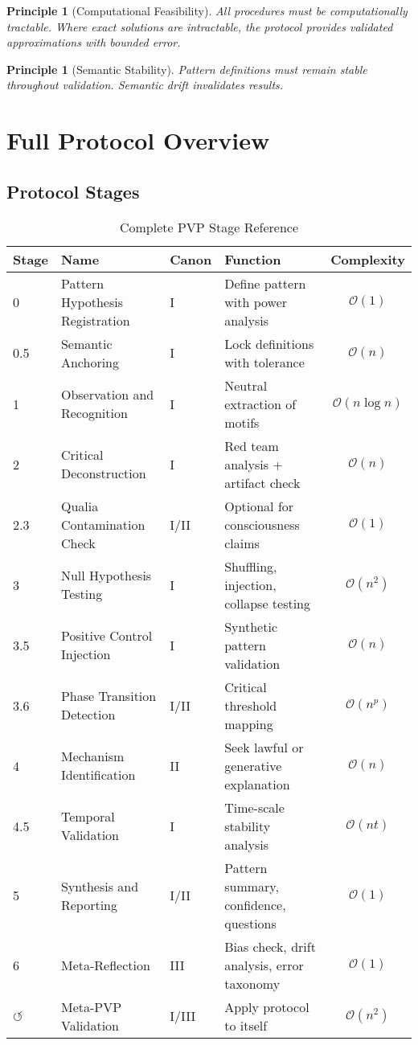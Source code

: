 \documentclass[12pt,oneside]{memoir}
\theoremstyle{plain}
\newtheorem{principle}[theorem]{Principle}
\theoremstyle{definition}
\theoremstyle{remark}
\newcommand{\PVP}{\textsc{PVP}}
\newcommand{\BigO}{\mathcal{O}}
\begin{document}
\begin{principle}[Computational Feasibility]
All procedures must be computationally tractable. Where exact solutions are intractable, the protocol provides validated approximations with bounded error.
\end{principle}

\begin{principle}[Semantic Stability]
Pattern definitions must remain stable throughout validation. Semantic drift invalidates results.
\end{principle}

\chapter{Full Protocol Overview}

\section{Protocol Stages}

\begin{table}[h]
\centering
\caption{Complete \PVP{} Stage Reference}
\label{tab:stages}
\begin{tabular}{llllc}
\toprule
\textbf{Stage} & \textbf{Name} & \textbf{Canon} & \textbf{Function} & \textbf{Complexity} \\
\midrule
0 & Pattern Hypothesis Registration & I & Define pattern with power analysis & $\BigO(1)$ \\
0.5 & Semantic Anchoring & I & Lock definitions with tolerance & $\BigO(n)$ \\
1 & Observation and Recognition & I & Neutral extraction of motifs & $\BigO(n \log n)$ \\
2 & Critical Deconstruction & I & Red team analysis + artifact check & $\BigO(n)$ \\
2.3 & Qualia Contamination Check & I/II & Optional for consciousness claims & $\BigO(1)$ \\
3 & Null Hypothesis Testing & I & Shuffling, injection, collapse testing & $\BigO(n^2)$ \\
3.5 & Positive Control Injection & I & Synthetic pattern validation & $\BigO(n)$ \\
3.6 & Phase Transition Detection & I/II & Critical threshold mapping & $\BigO(n^p)$ \\
4 & Mechanism Identification & II & Seek lawful or generative explanation & $\BigO(n)$ \\
4.5 & Temporal Validation & I & Time-scale stability analysis & $\BigO(nt)$ \\
5 & Synthesis and Reporting & I/II & Pattern summary, confidence, questions & $\BigO(1)$ \\
6 & Meta-Reflection & III & Bias check, drift analysis, error taxonomy & $\BigO(1)$ \\
$\circlearrowleft$ & Meta-PVP Validation & I/III & Apply protocol to itself & $\BigO(n^2)$ \\
\bottomrule
\end{tabular}
\end{table}
\end{document}
